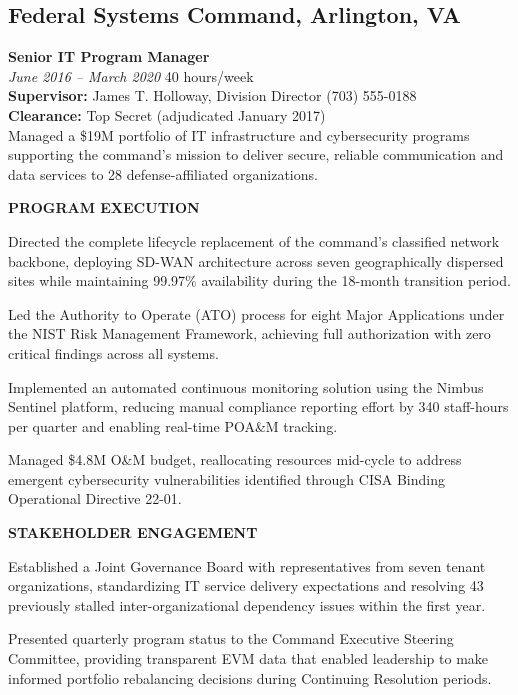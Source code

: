\documentclass[11pt,letterpaper]{article}
\newcommand{\dutysection}[1]{%
  \par\vspace{6pt}\noindent\textbf{\footnotesize\color{Navy}\MakeUppercase{#1}}\par\vspace{2pt}%
}
\newcommand{\gradebadge}[1]{%
  \tcbox[colback=Gold!15,colframe=Gold!50,arc=3pt,boxrule=0.5pt,
         top=1pt,bottom=1pt,left=5pt,right=5pt,size=small,nobeforeafter]{%
    \footnotesize\color{Gold!90!black}\textbf{GS-#1}}%
}
\begin{document}
\subsection{Federal Systems Command, Arlington, VA}
\noindent\textbf{Senior IT Program Manager} \hfill \gradebadge{13}\\[2pt]
\noindent\small\textit{June 2016 -- March 2020} \hfill \small 40 hours/week\\[2pt]
\noindent\small\textbf{Supervisor:} James T. Holloway, Division Director \hfill (703) 555-0188\\[2pt]
\noindent\small\textbf{Clearance:} Top Secret (adjudicated January 2017)\\[6pt]

Managed a \$19M portfolio of IT infrastructure and cybersecurity programs supporting the command's mission to deliver secure, reliable communication and data services to 28 defense-affiliated organizations.

\dutysection{Program Execution}
\begin{dutylist}
  \item Directed the complete lifecycle replacement of the command's classified network backbone, deploying SD-WAN architecture across seven geographically dispersed sites while maintaining 99.97\% availability during the 18-month transition period.
  \item Led the Authority to Operate (ATO) process for eight Major Applications under the NIST Risk Management Framework, achieving full authorization with zero critical findings across all systems.
  \item Implemented an automated continuous monitoring solution using the Nimbus Sentinel platform, reducing manual compliance reporting effort by 340 staff-hours per quarter and enabling real-time POA\&M tracking.
  \item Managed \$4.8M O\&M budget, reallocating resources mid-cycle to address emergent cybersecurity vulnerabilities identified through CISA Binding Operational Directive 22-01.
\end{dutylist}

\dutysection{Stakeholder Engagement}
\begin{dutylist}
  \item Established a Joint Governance Board with representatives from seven tenant organizations, standardizing IT service delivery expectations and resolving 43 previously stalled inter-organizational dependency issues within the first year.
  \item Presented quarterly program status to the Command Executive Steering Committee, providing transparent EVM data that enabled leadership to make informed portfolio rebalancing decisions during Continuing Resolution periods.
\end{dutylist}
\end{document}

